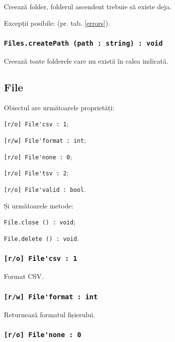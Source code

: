 Creează folder, folderul ascendent trebuie să existe deja.

Excepții posibile:  (pr. tab. \ref{errors}).

\subsubsection{\lstinline|Files.createPath (path : string) : void|}

Creează toate folderele care nu există în calea indicată.

\subsection{{\color{orange} File}}

Obiectul \file{} are următoarele proprietăți:
\begin{icItems}
	\item \lstinline|[r/o] File'csv : 1|;
	\item \lstinline|[r/w] File'format : int|;
	\item \lstinline|[r/o] File'none : 0|;
	\item \lstinline|[r/o] File'tsv : 2|;
	\item \lstinline|[r/o] File'valid : bool|.
\end{icItems}

Și următoarele metode:
\begin{icItems}
	\item \lstinline|File.close () : void|;
	\item \lstinline|File.delete () : void|.
\end{icItems}

\subsubsection{\lstinline|[r/o] File'csv : 1|}

Format CSV.

\subsubsection{\lstinline|[r/w] File'format : int|}

Returnează formatul fișierului.

\subsubsection{\lstinline|[r/o] File'none : 0|}

